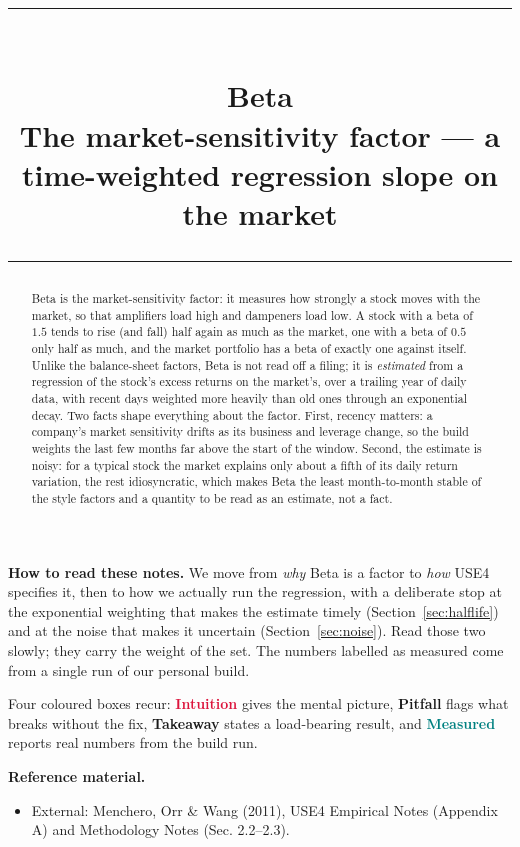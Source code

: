 \documentclass[11pt]{article}
\title{\vspace{-2.2em}
  {\color{steel}\rule{\textwidth}{1.3pt}}\\[0.7em]
  \Huge\bfseries Beta\\[0.35em]
  \large\mdseries The market-sensitivity factor --- a time-weighted regression slope on the market\\[0.4em]
  {\color{steel}\rule{\textwidth}{0.7pt}}}
\author{}
\date{}
\theoremstyle{definition}
\theoremstyle{plain}
\theoremstyle{remark}
\begin{document}
\maketitle
\thispagestyle{empty}

\begin{abstract}
Beta is the market-sensitivity factor: it measures how strongly a stock moves with the market, so that amplifiers load high and dampeners load low. A stock with a beta of $1.5$ tends to rise (and fall) half again as much as the market, one with a beta of $0.5$ only half as much, and the market portfolio has a beta of exactly one against itself. Unlike the balance-sheet factors, Beta is not read off a filing; it is \emph{estimated} from a regression of the stock's excess returns on the market's, over a trailing year of daily data, with recent days weighted more heavily than old ones through an exponential decay. Two facts shape everything about the factor. First, recency matters: a company's market sensitivity drifts as its business and leverage change, so the build weights the last few months far above the start of the window. Second, the estimate is noisy: for a typical stock the market explains only about a fifth of its daily return variation, the rest idiosyncratic, which makes Beta the least month-to-month stable of the style factors and a quantity to be read as an estimate, not a fact.
\end{abstract}

\begin{tcolorbox}[colback=paperlt,colframe=ink!30,boxrule=0.4pt,arc=2pt,left=10pt,right=10pt,top=8pt,bottom=8pt]
\textbf{How to read these notes.} We move from \emph{why} Beta is a factor to \emph{how} USE4 specifies it, then to how we actually run the regression, with a deliberate stop at the exponential weighting that makes the estimate timely (Section~\ref{sec:halflife}) and at the noise that makes it uncertain (Section~\ref{sec:noise}). Read those two slowly; they carry the weight of the set. The numbers labelled as measured come from a single run of our personal build.

\smallskip
Four coloured boxes recur: \textcolor{crimson}{\textbf{Intuition}} gives the mental picture, \textcolor{amber}{\textbf{Pitfall}} flags what breaks without the fix, \textcolor{steel}{\textbf{Takeaway}} states a load-bearing result, and \textcolor{teal}{\textbf{Measured}} reports real numbers from the build run.

\smallskip
\textbf{Reference material.}
\begin{itemize}[leftmargin=1.4em,topsep=2pt]
  \item External: Menchero, Orr \& Wang (2011), USE4 Empirical Notes (Appendix A) and Methodology Notes (Sec. 2.2--2.3).
\end{itemize}
\end{tcolorbox}
\end{document}

